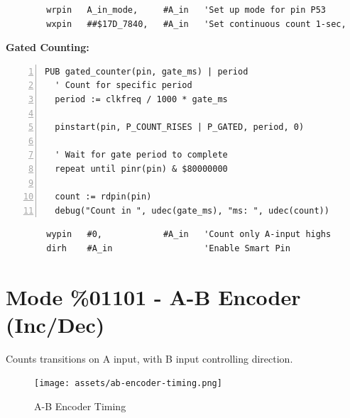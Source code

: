 \documentclass[11pt,a4paper,oneside,english]{book}
\begin{document}
\begin{PASM2Block}
\begin{lstlisting}
        wrpin   A_in_mode,     #A_in   'Set up mode for pin P53
        wxpin   ##$17D_7840,   #A_in   'Set continuous count 1-sec,
\end{lstlisting}
\end{PASM2Block}

\textbf{Gated Counting:}

\begin{Spin2Block}
\begin{Verbatim}[numbers=left,numbersep=5pt,xleftmargin=15pt]
PUB gated_counter(pin, gate_ms) | period
  ' Count for specific period
  period := clkfreq / 1000 * gate_ms
  
  pinstart(pin, P_COUNT_RISES | P_GATED, period, 0)
  
  ' Wait for gate period to complete
  repeat until pinr(pin) & $80000000
  
  count := rdpin(pin)
  debug("Count in ", udec(gate_ms), "ms: ", udec(count))
\end{Verbatim}
\end{Spin2Block}

\begin{PASM2Block}
\begin{lstlisting}
        wypin   #0,            #A_in   'Count only A-input highs
        dirh    #A_in                  'Enable Smart Pin
\end{lstlisting}
\end{PASM2Block}

\clearpage

\hypertarget{mode-01101---a-b-encoder-incdec}{%
\section{Mode \%01101 - A-B Encoder
(Inc/Dec)}\label{mode-01101---a-b-encoder-incdec}}

Counts transitions on A input, with B input controlling direction.

\begin{figure}
\centering
\texttt{[image: assets/ab-encoder-timing.png]}
\caption{A-B Encoder Timing}
\end{figure}
\end{document}
